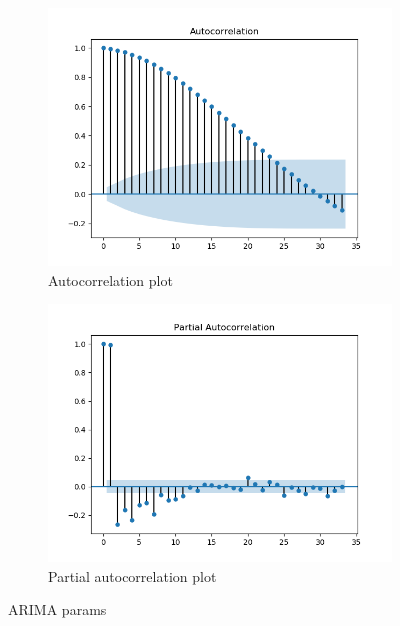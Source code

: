 \documentclass[12pt]{article}
\begin{document}
  \begin{figure}
    \centering
    \begin{subfigure}[b]{0.4\linewidth}
      \includegraphics[width=\linewidth]{resources/baseline/arima_10_acf.png}
      \caption{Autocorrelation plot}
    \end{subfigure}
    \begin{subfigure}[b]{0.4\linewidth}
      \includegraphics[width=\linewidth]{resources/baseline/arima_10_pacf.png}
      \caption{Partial autocorrelation plot}
    \end{subfigure}
    \caption{ARIMA params}
    \label{fig:arima_params}
  \end{figure}
\end{document}

